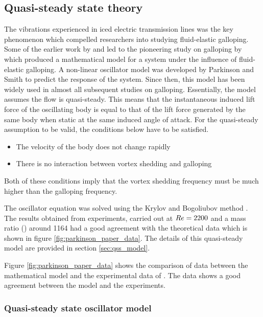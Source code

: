 \subsection{Quasi-steady state theory}
\label{sec:QSS theory}


The vibrations experienced in iced electric transmission lines was the key phenomenon which compelled researchers into studying fluid-elastic galloping. Some of the earlier work by \cite{Glauert1919} and \cite{DenHartog1956} led to the pioneering study on galloping by \cite{Parkinson1964} which produced a mathematical model for a system under the influence of fluid-elastic galloping. A non-linear oscillator model was developed by Parkinson and Smith to predict the response of the system. Since then, this model has been widely used in almost all subsequent studies on galloping. Essentially, the model assumes the flow is quasi-steady. This means that the instantaneous induced lift force of the oscillating body is equal to that of the lift force generated by the same body when static at the same induced angle of attack. For the quasi-steady assumption to be valid, the conditions below have to be satisfied.

\begin{itemize}
 \item The velocity of the body does not change rapidly
 \item There is no interaction between vortex shedding and galloping
\end{itemize}

Both of these conditions imply that the vortex shedding frequency must be much higher than the galloping frequency.

The oscillator equation was solved using the Krylov and Bogoliubov method \citep{Parkinson1964}. The results obtained from experiments, carried out at $Re=2200$ and a mass ratio (\mstar) around 1164 had a good agreement with the theoretical data which is shown in figure \ref{fig:parkinson_paper_data}. The details of this quasi-steady model are provided in section \ref{sec:qss_model}.



Figure \ref{fig:parkinson_paper_data} shows the comparison of data between the mathematical model and the experimental data of \citep{Parkinson1964}. The data shows a good agreement between the model and the experiments.  

\subsubsection*{Quasi-steady state oscillator model}
\label{sec:qss_model}

